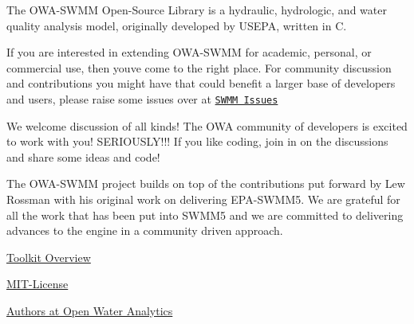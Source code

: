 The O\+W\+A-\/\+S\+W\+MM Open-\/\+Source Library is a hydraulic, hydrologic, and water quality analysis model, originally developed by U\+S\+E\+PA, written in C.

If you are interested in extending O\+W\+A-\/\+S\+W\+MM for academic, personal, or commercial use, then you\textquotesingle{}ve come to the right place. For community discussion and contributions you might have that could benefit a larger base of developers and users, please raise some issues over at \href{https://github.com/OpenWaterAnalytics/Stormwater-Management-Model/issues}{\tt S\+W\+MM Issues}

We welcome discussion of all kinds! The O\+WA community of developers is excited to work with you! S\+E\+R\+I\+O\+U\+S\+L\+Y!!! If you like coding, join in on the discussions and share some ideas and code!

The O\+W\+A-\/\+S\+W\+MM project builds on top of the contributions put forward by Lew Rossman with his original work on delivering E\+P\+A-\/\+S\+W\+M\+M5. We are grateful for all the work that has been put into S\+W\+M\+M5 and we are committed to delivering advances to the engine in a community driven approach.


\begin{DoxyItemize}
\item \hyperlink{toolkit-overview}{Toolkit Overview}
\item \hyperlink{group___m_i_t-_license}{M\+I\+T-\/\+License}
\item \hyperlink{group___a_u_t_h_o_r_s}{Authors at Open Water Analytics} 
\end{DoxyItemize}